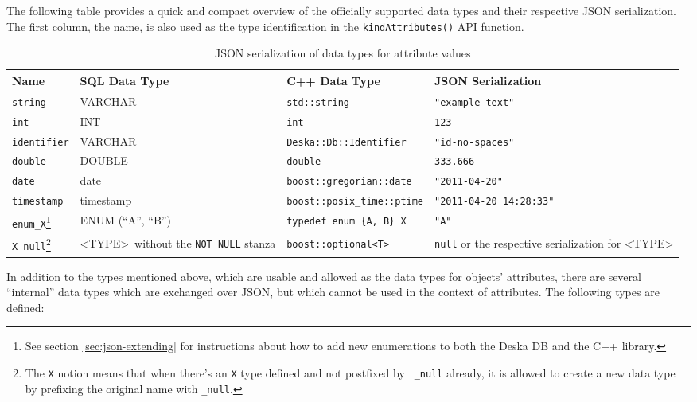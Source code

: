 \documentclass{article}
\begin{document}
The following table provides a quick and compact overview of the officially supported data types and their respective
JSON serialization.  The first column, the name, is also used as the type identification in the {\tt kindAttributes()}
API function.

\begin{longtable}{ p{18mm} | p{35mm} p{41mm} p{45mm} }
    \caption{JSON serialization of data types for attribute values} \\
    Name & SQL Data Type & C++ Data Type & JSON Serialization \\
    \hline
    \endhead
    {\tt string} & VARCHAR & {\tt std::string} & {\tt "example text"} \\
    {\tt int} & INT & {\tt int} & {\tt 123} \\
    {\tt identifier} & VARCHAR & {\tt Deska::Db::Identifier} & {\tt "id-no-spaces"} \\
    {\tt double} & DOUBLE & {\tt double} & {\tt 333.666} \\
    {\tt date} & date & {\tt boost::gregorian::date} & {\tt "2011-04-20"} \\
    {\tt timestamp} & timestamp & {\tt boost::posix\_time::ptime} & {\tt "2011-04-20 14:28:33"} \\
    {\tt enum\_X}\footnote{See section \ref{sec:json-extending} for instructions about how to add new enumerations to both
        the Deska DB and the C++ library.} & ENUM (``A'', ``B'') & {\tt typedef enum \{A, B\} X} & {\tt "A"} \\
    {\tt X\_null}\footnote{The {\tt X} notion means that when there's an {\tt X} type defined and not postfixed by {\tt
        \_null} already, it is allowed to create a new data type by prefixing the original name with {\tt \_null}.} &
        \textless TYPE\textgreater~without the {\tt NOT~NULL} stanza & {\tt boost::optional<T>} &
        {\tt null} or the respective serialization for \textless TYPE\textgreater \\
\end{longtable}

In addition to the types mentioned above, which are usable and allowed as the data types for objects' attributes, there
are several ``internal'' data types which are exchanged over JSON, but which cannot be used in the context of
attributes.  The following types are defined:
\end{document}
